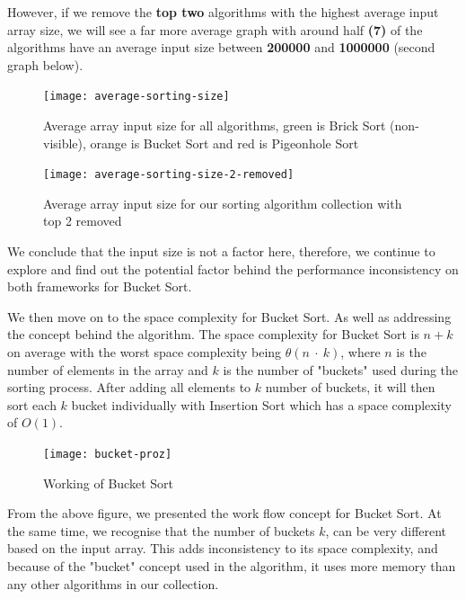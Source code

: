 However, if we remove the \textbf{top two} algorithms with the highest average input array size, we will see a far more average graph with around half \textbf{(7)} of the algorithms have an average input size between \textbf{200000} and \textbf{1000000} (second graph below).

\newpage
\bigskip
\begin{figure}[hp]
\centering
\texttt{[image: average-sorting-size]}
\caption{\footnotesize{Average array input size for all algorithms, green is Brick Sort (non-visible), orange is Bucket Sort and red is Pigeonhole Sort}}
\captionsetup{aboveskip=0pt,font=it}
\end{figure}
\bigskip

\bigskip
\begin{figure}[hp]
\centering
\texttt{[image: average-sorting-size-2-removed]}
\caption{\footnotesize{Average array input size for our sorting algorithm collection with top 2 removed}}
\captionsetup{aboveskip=0pt,font=it}
\end{figure}
\bigskip

We conclude that the input size is not a factor here, therefore, we continue to explore and find out the potential factor behind the performance inconsistency on both frameworks for Bucket Sort.

We then move on to the space complexity for Bucket Sort. As well as addressing the concept behind the algorithm. The space complexity for Bucket Sort is \(n + k\) on average with the worst space complexity being \(\theta(n\ \cdot\ k)\), where \(n\) is the number of elements in the array and \(k\) is the number of "buckets" used during the sorting process. After adding all elements to \(k\) number of buckets, it will then sort each \(k\) bucket individually with Insertion Sort which has a space complexity of \(O(1)\).

\bigskip
\begin{figure}[hp]
\centering
\texttt{[image: bucket-proz]}
\caption{\footnotesize{Working of Bucket Sort}}
\captionsetup{aboveskip=0pt,font=it}
\end{figure}
\bigskip

From the above figure, we presented the work flow concept for Bucket Sort. At the same time, we recognise that the number of buckets \(k\), can be very different based on the input array. This adds inconsistency to its space complexity, and because of the "bucket" concept used in the algorithm, it uses more memory than any other algorithms in our collection.

